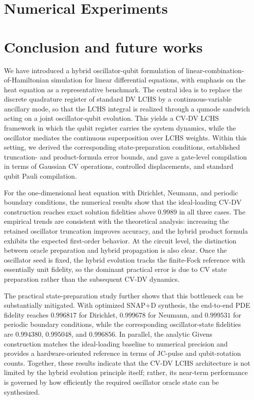 \documentclass{article}
\begin{document}
\section{Numerical Experiments}
\label{sec:clean_experiments}





\section{Conclusion and future works}

We have introduced a hybrid oscillator-qubit formulation of linear-combination-of-Hamiltonian simulation for linear differential equations, with emphasis on the heat equation as a representative benchmark. The central idea is to replace the discrete quadrature register of standard DV LCHS by a continuous-variable ancillary mode, so that the LCHS integral is realized through a qumode sandwich acting on a joint oscillator-qubit evolution. This yields a CV-DV LCHS framework in which the qubit register carries the system dynamics, while the oscillator mediates the continuous superposition over LCHS weights. Within this setting, we derived the corresponding state-preparation conditions, established truncation- and product-formula error bounds, and gave a gate-level compilation in terms of Gaussian CV operations, controlled displacements, and standard qubit Pauli compilation.

For the one-dimensional heat equation with Dirichlet, Neumann, and periodic boundary conditions, the numerical results show that the ideal-loading CV-DV construction reaches exact solution fidelities above $0.9989$ in all three cases. The empirical trends are consistent with the theoretical analysis: increasing the retained oscillator truncation improves accuracy, and the hybrid product formula exhibits the expected first-order behavior. At the circuit level, the distinction between oracle preparation and hybrid propagation is also clear. Once the oscillator seed is fixed, the hybrid evolution tracks the finite-Fock reference with essentially unit fidelity, so the dominant practical error is due to CV state preparation rather than the subsequent CV-DV dynamics.

The practical state-preparation study further shows that this bottleneck can be substantially mitigated. With optimized SNAP$+$D synthesis, the end-to-end PDE fidelity reaches $0.996817$ for Dirichlet, $0.999678$ for Neumann, and $0.999531$ for periodic boundary conditions, while the corresponding oscillator-state fidelities are $0.994380$, $0.995048$, and $0.996856$. In parallel, the analytic Givens construction matches the ideal-loading baseline to numerical precision and provides a hardware-oriented reference in terms of JC-pulse and qubit-rotation counts. Together, these results indicate that the CV-DV LCHS architecture is not limited by the hybrid evolution principle itself; rather, its near-term performance is governed by how efficiently the required oscillator oracle state can be synthesized.
\end{document}

